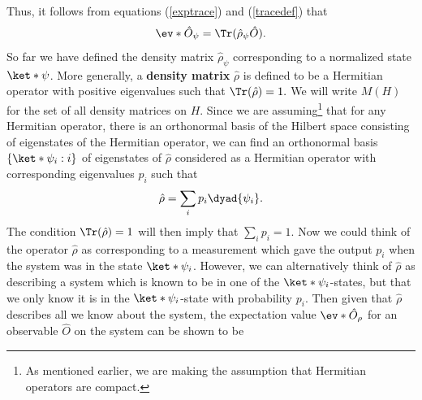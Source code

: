 \documentclass[12pt]{report}
\begin{document}
    Thus, it follows from equations (\ref{exptrace}) and (\ref{tracedef}) that 
    \begin{equation}
    \ev*{\hat{O}}_\psi=\Tr (\hat{\rho}_\psi\hat{O}\label{traceev}).
    \end{equation}
     So far we have defined the density matrix $\hat{\rho}_\psi$ corresponding to a normalized state $\ket*{\psi}$. More generally, a \textbf{density matrix} $\hat{\rho}$  %
% 
     is defined to be a Hermitian operator with positive eigenvalues such that $\Tr(\hat{\rho})=1.$ We will write $M(H)$   %
% 
for the set of all density matrices on $H$. Since we are assuming\footnote{As mentioned earlier, we are making the assumption that Hermitian operators are compact.} that for any Hermitian operator, there is an orthonormal basis of the Hilbert space consisting of eigenstates of the Hermitian operator, we can find an orthonormal basis $\{\ket*{\psi_i}:i\}$ of eigenstates of $\hat{\rho}$ considered as a Hermitian operator with corresponding eigenvalues $p_i$ such that 
    \begin{equation}\label{rhodiag}
    \hat{\rho}=\sum_i p_i\dyad{\psi_i}.
    \end{equation} 
    The condition $\Tr(\hat{\rho})=1$ will then imply that $\sum_i p_i =1$. Now we could think of the operator $\hat{\rho}$ as corresponding to a measurement which gave the output $p_i$ when the system was in the state $\ket*{\psi_i}$. However, we can alternatively think of $\hat{\rho}$ as describing a system which is known to be in one of the $\ket*{\psi_i}$-states, but that we only know it is in the $\ket*{\psi_i}$-state with probability $p_i$. Then given that $\hat{\rho}$ describes all we know about the system, the expectation value $\ev*{\hat{O}}_\rho$ for an observable $\hat{O}$ on the system can be shown to be    %
% 
\end{document}
